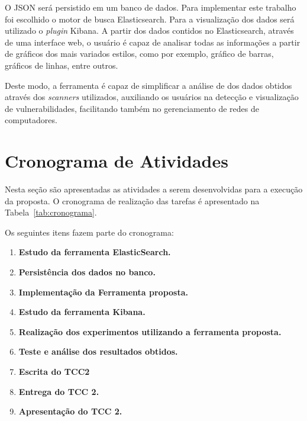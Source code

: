 O \gls{JSON} será persistido em um banco de dados. Para implementar este trabalho foi escolhido o motor de busca Elasticsearch. Para a visualização dos dados será utilizado o \textit{plugin} Kibana. A partir dos dados contidos no Elasticsearch, através de uma interface web, o usuário é capaz de analisar todas as informações a partir de gráficos dos mais variados estilos, como por exemplo, gráfico de barras, gráficos de linhas, entre outros.


Deste modo, a ferramenta é capaz de simplificar a análise de dos dados obtidos através dos \textit{scanners} utilizados, auxiliando os usuários na detecção e visualização de vulnerabilidades, facilitando também no gerenciamento de redes de computadores.


\section{Cronograma de Atividades}

Nesta seção são apresentadas as atividades a serem desenvolvidas para a execução da proposta. O cronograma de realização das tarefas é apresentado na Tabela~\ref{tab:cronograma}.


Os seguintes itens fazem parte do cronograma:

\begin{enumerate}
\item \textbf{Estudo da ferramenta ElasticSearch.}
\item \textbf{Persistência dos dados no banco.}
\item \textbf{Implementação da Ferramenta proposta.}
\item \textbf{Estudo da ferramenta Kibana.}
\item \textbf{Realização dos experimentos utilizando a ferramenta proposta.}
\item \textbf{Teste e análise dos resultados obtidos.}
\item \textbf{Escrita do TCC2}
\item \textbf{Entrega do TCC 2.}
\item \textbf{Apresentação do TCC 2.}
\end{enumerate}




